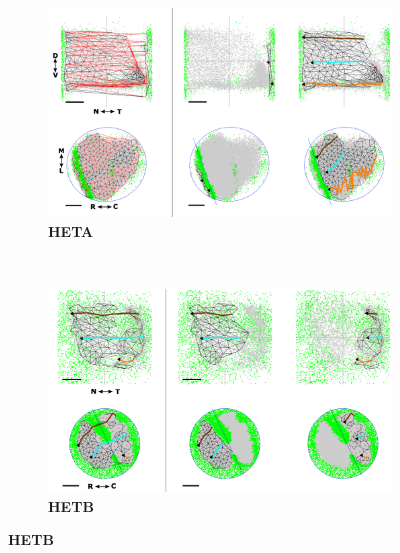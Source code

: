 \begin{landscape}
\begin{figure}[h!]
	\centering
	\begin{subfigure}{0.75\textwidth}
		\centering
		\includegraphics[width=\textwidth]{images/lattice/figHETA1}
		\caption{\textbf{HETA}}
	\end{subfigure}
	~
	\begin{subfigure}{0.75\textwidth}
		\centering
		\includegraphics[width=\textwidth]{images/lattice/figHETB1}
		\caption{\textbf{HETB}}
	\end{subfigure}
	

\end{figure}
\end{landscape}
